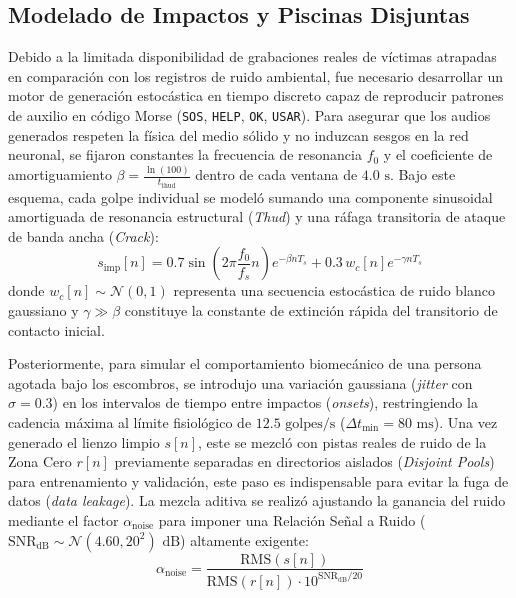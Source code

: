 \documentclass[journal, a4paper]{IEEEtran}
\begin{document}
\subsection{Modelado de Impactos y Piscinas Disjuntas}
Debido a la limitada disponibilidad de grabaciones reales de víctimas atrapadas en comparación con los registros de ruido ambiental, fue necesario desarrollar un motor de generación estocástica en tiempo discreto capaz de reproducir patrones de auxilio en código Morse (\texttt{SOS}, \texttt{HELP}, \texttt{OK}, \texttt{USAR}). Para asegurar que los audios generados respeten la física del medio sólido y no induzcan sesgos en la red neuronal, se fijaron constantes la frecuencia de resonancia $f_0$ y el coeficiente de amortiguamiento $\beta = \frac{\ln(100)}{t_{\text{thud}}}$ dentro de cada ventana de $4.0\text{ s}$. Bajo este esquema, cada golpe individual se modeló sumando una componente sinusoidal amortiguada de resonancia estructural (\textit{Thud}) y una ráfaga transitoria de ataque de banda ancha (\textit{Crack}):
\begin{equation}
    s_{\text{imp}}[n] = 0.7 \sin\left(2\pi \frac{f_0}{f_s} n\right) e^{-\beta n T_s} + 0.3 \, w_c[n] e^{-\gamma n T_s}
\end{equation}
donde $w_c[n] \sim \mathcal{N}(0, 1)$ representa una secuencia estocástica de ruido blanco gaussiano y $\gamma \gg \beta$ constituye la constante de extinción rápida del transitorio de contacto inicial.

Posteriormente, para simular el comportamiento biomecánico de una persona agotada bajo los escombros, se introdujo una variación gaussiana (\textit{jitter} con $\sigma = 0.3$) en los intervalos de tiempo entre impactos (\textit{onsets}), restringiendo la cadencia máxima al límite fisiológico de $12.5\text{ golpes/s}$ ($\Delta t_{\min} = 80\text{ ms}$). Una vez generado el lienzo limpio $s[n]$, este se mezcló con pistas reales de ruido de la Zona Cero $r[n]$ previamente separadas en directorios aislados (\textit{Disjoint Pools}) para entrenamiento y validación, este paso es indispensable para evitar la fuga de datos (\textit{data leakage}). La mezcla aditiva se realizó ajustando la ganancia del ruido mediante el factor $\alpha_{\text{noise}}$ para imponer una Relación Señal a Ruido ($\text{SNR}_{\text{dB}} \sim \mathcal{N}(4.60, 20^2)\text{ dB}$) altamente exigente:
\begin{equation}
    \alpha_{\text{noise}} = \frac{\text{RMS}(s[n])}{\text{RMS}(r[n]) \cdot 10^{\text{SNR}_{\text{dB}} / 20}}
\end{equation}
\end{document}
